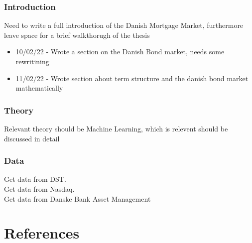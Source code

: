 \documentclass[12pt,twoside]{reedthesis}
\providecommand{\tightlist}{%
  \setlength{\itemsep}{0pt}\setlength{\parskip}{0pt}}
\begin{document}
\hypertarget{introduction}{%
\subsection*{Introduction}\label{introduction}}

Need to write a full introduction of the Danish Mortgage Market, furthermore
leave space for a brief walkthorugh of the thesis
\begin{itemize}
\tightlist
\item
  10/02/22 - Wrote a section on the Danish Bond market, needs some rewritining
\item
  11/02/22 - Wrote section about term structure and the danish bond market mathematically
\end{itemize}
\hypertarget{theory}{%
\subsection*{Theory}\label{theory}}

Relevant theory should be Machine Learning, which is relevent should be discussed
in detail

\hypertarget{data}{%
\subsection*{Data}\label{data}}

Get data from DST.\\
Get data from Nasdaq.\\
Get data from Danske Bank Asset Management

\backmatter

\hypertarget{references}{%
\chapter*{References}\label{references}}


\noindent

\setlength{\parindent}{-0.20in}
\end{document}

